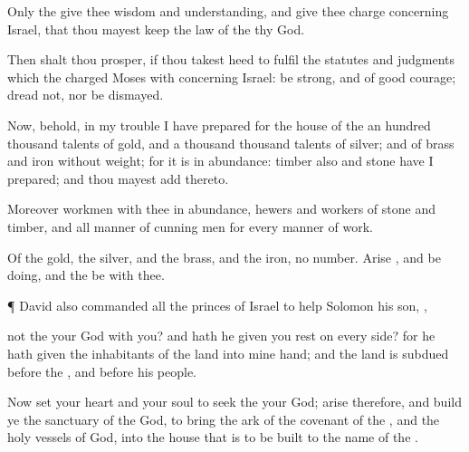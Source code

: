 {Only the
{}
give thee
wisdom and
understanding, and give thee
charge concerning
Israel, that thou mayest
keep the
law of the
{} thy
God.

Then shalt thou
prosper, if thou takest
heed to
fulfil the
statutes and
judgments which the
{}
charged
Moses with concerning
Israel: be
strong, and of good
courage;
dread not, nor be
dismayed.

Now, behold, in my
trouble I have
prepared for the
house of the
{} an
hundred
thousand
talents of
gold, and a
thousand
thousand
talents of
silver; and of
brass and
iron without
weight; for it is in
abundance:
timber also and
stone have I
prepared; and thou mayest
add thereto.

Moreover
{}
workmen with thee in
abundance,
hewers and
workers of
stone and
timber, and all manner of cunning
men for every manner of
work.

Of the
gold, the
silver, and the
brass, and the
iron,
{} no
number.
Arise
{}, and be
doing, and the
{} be with thee.


\par }{\PP {}¶
David also
commanded all the
princes of
Israel to
help
Solomon his
son,
{},

 not the
{} your
God with you? and hath he
{} given you
rest on every
side? for he hath
given the
inhabitants of the
land into mine
hand; and the
land is
subdued
before the
{}, and
before his
people.

Now
set your
heart and your
soul to
seek the
{} your
God;
arise therefore, and
build ye the
sanctuary of the
{}
God, to
bring the
ark of the
covenant of the
{}, and the
holy
vessels of
God, into the
house that is to be
built to the
name of the
{}.




\par }
